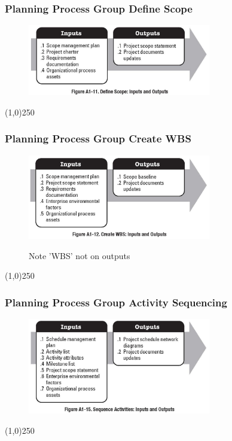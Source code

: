\begin{frame}
\frametitle{Planning Process Group \hfill Define Scope  }
 \begin{figure}
 	\centering
 		\includegraphics[width = 8cm]{images/FigA1-11.jpg}
 	\label{fig:A1-11}
 \end{figure} 
\end{frame}
\begin{center}\line(1,0){250}\end{center}



\begin{frame}
\frametitle{Planning Process Group \hfill Create WBS}
 \begin{figure}
 	\centering
 		\includegraphics[width = 8cm]{images/FigA1-12.jpg}
 	\label{fig:A1-12}
	\caption{Note 'WBS' not on outputs}
 \end{figure}
\end{frame}
\begin{center}\line(1,0){250}\end{center}



\begin{frame}
\frametitle{Planning Process Group \hfill Activity Sequencing}
 \begin{figure}
 	\centering
 		\includegraphics[width = 8cm]{images/FigA1-15.jpg}
 	\label{fig:A1-15}
 \end{figure}
\end{frame}
\begin{center}\line(1,0){250}\end{center}



